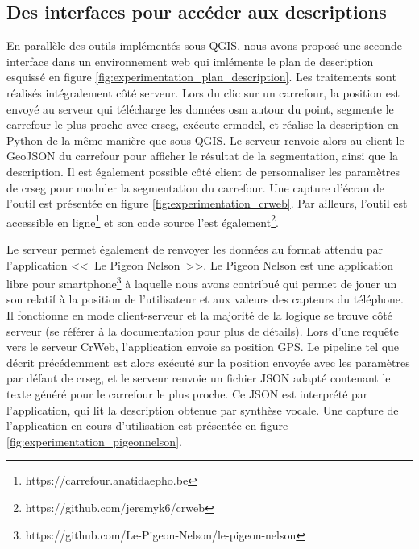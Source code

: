 \subsection{Des interfaces pour accéder aux descriptions}


En parallèle des outils implémentés sous QGIS, nous avons proposé une seconde interface dans un environnement web qui imlémente le plan de description esquissé en figure \ref{fig:experimentation_plan_description}. Les traitements sont réalisés intégralement côté serveur. Lors du clic sur un carrefour, la position est envoyé au serveur qui télécharge les données \gls{osm} autour du point, segmente le carrefour le plus proche avec crseg, exécute crmodel, et réalise la description en Python de la même manière que sous QGIS. Le serveur renvoie alors au client le GeoJSON du carrefour pour afficher le résultat de la segmentation, ainsi que la description. Il est également possible côté client de personnaliser les paramètres de crseg pour moduler la segmentation du carrefour. Une capture d'écran de l'outil est présentée en figure \ref{fig:experimentation_crweb}. Par ailleurs, l'outil est accessible en ligne\footnote{https://carrefour.anatidaepho.be} et son code source l'est également\footnote{https://github.com/jeremyk6/crweb}.

\newpar{}


Le serveur permet également de renvoyer les données au format attendu par l'application <<~Le Pigeon Nelson~>>. Le Pigeon Nelson est une application libre pour smartphone\footnote{https://github.com/Le-Pigeon-Nelson/le-pigeon-nelson} à laquelle nous avons contribué qui permet de jouer un son relatif à la position de l'utilisateur et aux valeurs des capteurs du téléphone. Il fonctionne en mode client-serveur et la majorité de la logique se trouve côté serveur (se référer à la documentation pour plus de détails). Lors d'une requête vers le serveur CrWeb, l'application envoie sa position GPS. Le pipeline tel que décrit précédemment est alors exécuté sur la position envoyée avec les paramètres par défaut de crseg, et le serveur renvoie un fichier JSON adapté contenant le texte généré pour le carrefour le plus proche. Ce JSON est interprété par l'application, qui lit la description obtenue par synthèse vocale. Une capture de l'application en cours d'utilisation est présentée en figure \ref{fig:experimentation_pigeonnelson}.

